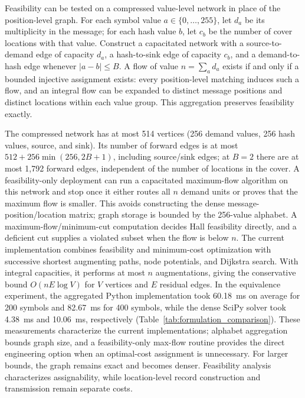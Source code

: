 \documentclass[preprint,12pt]{elsarticle}
\theoremstyle{plain}
\providecommand{\DIFaddtex}[1]{{\protect\color{blue} \sf #1}} %
\providecommand{\DIFdeltex}[1]{{\protect\color{red} \scriptsize #1}} %
\providecommand{\DIFaddbegin}{} %
\providecommand{\DIFaddend}{} %
\providecommand{\DIFdelbegin}{} %
\providecommand{\DIFdelend}{} %
\providecommand{\DIFadd}[1]{\texorpdfstring{\DIFaddtex{#1}}{#1}} %
\providecommand{\DIFdel}[1]{\texorpdfstring{\DIFdeltex{#1}}{}} %
\providecommand{\DIFscaledelfig}{0.5}
\newlength{\DIFdelgraphicswidth} %
\newlength{\DIFdelgraphicsheight} %
\providecommand{\DIFaddincludegraphics}[2][]{{\color{blue}\fbox{\DIFOincludegraphics[#1]{#2}}}} %
\providecommand{\DIFdelincludegraphics}[2][]{%
\sbox{\DIFdelgraphicsbox}{\DIFOincludegraphics[#1]{#2}}%
\settoboxwidth{\DIFdelgraphicswidth}{\DIFdelgraphicsbox} %
\settoboxtotalheight{\DIFdelgraphicsheight}{\DIFdelgraphicsbox} %
\scalebox{\DIFscaledelfig}{%
\parbox[b]{\DIFdelgraphicswidth}{\usebox{\DIFdelgraphicsbox}\\[-\baselineskip] \rule{\DIFdelgraphicswidth}{0em}}\llap{\resizebox{\DIFdelgraphicswidth}{\DIFdelgraphicsheight}{%
\setlength{\unitlength}{\DIFdelgraphicswidth}%
\begin{picture}(1,1)%
\thicklines\linethickness{2pt} %
{\color[rgb]{1,0,0}\put(0,0){\framebox(1,1){}}}%
{\color[rgb]{1,0,0}\put(0,0){\line( 1,1){1}}}%
{\color[rgb]{1,0,0}\put(0,1){\line(1,-1){1}}}%
\end{picture}%
}\hspace*{3pt}}} %
} %
\DeclareRobustCommand{\DIFaddbegin}{\DIFOaddbegin \let\includegraphics\DIFaddincludegraphics} %
\DeclareRobustCommand{\DIFaddend}{\DIFOaddend \let\includegraphics\DIFOincludegraphics} %
\DeclareRobustCommand{\DIFdelbegin}{\DIFOdelbegin \let\includegraphics\DIFdelincludegraphics} %
\DeclareRobustCommand{\DIFdelend}{\DIFOaddend \let\includegraphics\DIFOincludegraphics} %
\renewcommand{\DIFdel}[1]{}
\renewcommand{\DIFdelincludegraphics}[2][]{}
\begin{document}
Feasibility can be tested on a compressed value-level network \DIFdelbegin \DIFdel{without building
}\DIFdelend \DIFaddbegin \DIFadd{in place of
}\DIFaddend the position-level graph. For each symbol value $a\in\{0,\ldots,255\}$, let $d_a$ be its
multiplicity in the message; for each hash value $b$, let $c_b$ be the number
of cover locations with that value. Construct a capacitated network with a
source-to-demand edge of capacity $d_a$, a hash-to-sink edge of capacity
$c_b$, and a demand-to-hash edge whenever $|a-b|\leq B$. A flow of value
$n=\sum_a d_a$ exists if and only if a bounded injective assignment exists:
every position-level matching induces such a flow, and an integral flow can
be expanded to distinct message positions and distinct locations within each
value group. This aggregation preserves feasibility exactly.

The compressed network has at most 514 vertices (256 demand values, 256 hash
values, source, and sink). Its number of forward edges is at most
$512+256\min(256,2B+1)$, including source/sink edges; at $B=2$ there are at
most 1,792 forward edges, independent of the number of locations in the
cover. A feasibility-only deployment can run a capacitated maximum-flow
algorithm on this network and stop once it either routes all $n$ demand units
or proves that the maximum flow is smaller. This avoids constructing the
dense message-position/location matrix; graph storage is bounded by the
256-value alphabet. \DIFaddbegin \DIFadd{A maximum-flow/minimum-cut computation decides Hall
feasibility directly, and a deficient cut supplies a violated subset when the
flow is below $n$. }\DIFaddend The
current implementation combines feasibility and
minimum-cost optimization with successive shortest augmenting paths, node
potentials, and Dijkstra search. With integral capacities, it performs at
most $n$ augmentations, giving the conservative bound
$O(nE\log V)$ for $V$ vertices and $E$ residual edges. In the equivalence
experiment, the aggregated Python implementation took 60.18~ms on average
for 200 symbols and 82.67~ms for 400 symbols, while the dense SciPy solver
took 4.38~ms and 10.06~ms, respectively (Table~\ref{tab:formulation_comparison}).
These measurements characterize the current implementations; alphabet
aggregation bounds graph size, and a feasibility-only max-flow routine
provides the direct engineering option when an optimal-cost assignment is
unnecessary. For larger bounds, the graph remains exact and becomes denser.
Feasibility analysis characterizes assignability, while location-level record
construction and transmission remain separate costs.
\end{document}
